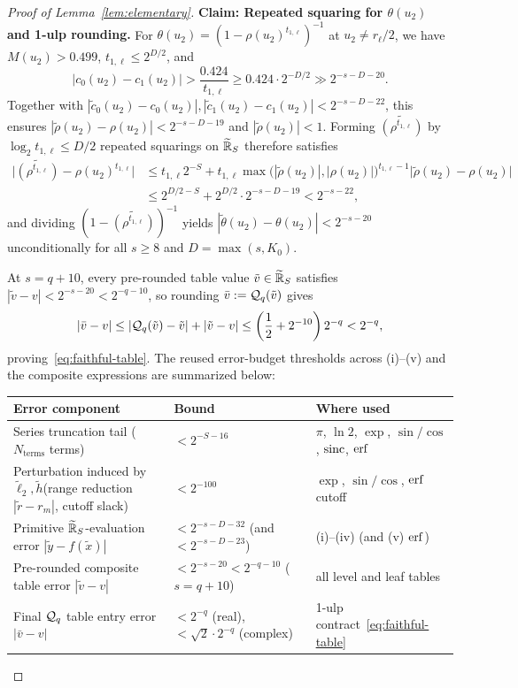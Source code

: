 \begin{proof}[Proof of Lemma~\ref{lem:elementary}]
\textbf{Claim: Repeated squaring for $\theta(u_2)$ and 1-ulp rounding.}
For $\theta(u_2) = (1 - \rho(u_2)^{t_{1,\ell}})^{-1}$ at $u_2 \ne r_\ell/2$, we have $M(u_2) > 0.499$, $t_{1,\ell} \le 2^{D/2}$, and
\[
  |c_0(u_2) - c_1(u_2)| > \frac{0.424}{t_{1,\ell}} \ge 0.424 \cdot 2^{-D/2} \gg 2^{-s-D-20}.
\]
Together with $|\tilde{c}_0(u_2) - c_0(u_2)|, |\tilde{c}_1(u_2) - c_1(u_2)| < 2^{-s-D-22}$, this ensures $|\tilde{\rho}(u_2) - \rho(u_2)| < 2^{-s-D-19}$ and $|\tilde{\rho}(u_2)| < 1$. Forming $\widetilde{(\rho^{t_{1,\ell}})}$ by $\log_2 t_{1,\ell} \le D/2$ repeated squarings on $\widetilde{\mathbb{R}}_S$ therefore satisfies
\begin{align*}
  \bigl|\widetilde{(\rho^{t_{1,\ell}})} - \rho(u_2)^{t_{1,\ell}}\bigr|
  &\le t_{1,\ell} 2^{-S} + t_{1,\ell}\max\bigl(|\tilde{\rho}(u_2)|, |\rho(u_2)|\bigr)^{t_{1,\ell}-1}\bigl|\tilde{\rho}(u_2) - \rho(u_2)\bigr| \\
  &\le 2^{D/2 - S} + 2^{D/2} \cdot 2^{-s-D-19} < 2^{-s-22},
\end{align*}
and dividing $(1 - \widetilde{(\rho^{t_{1,\ell}})})^{-1}$ yields $|\tilde{\theta}(u_2) - \theta(u_2)| < 2^{-s-20}$ unconditionally for all $s \ge 8$ and $D = \max(s, K_0)$.

At $s = q + 10$, every pre-rounded table value $\tilde{v} \in \widetilde{\mathbb{R}}_S$ satisfies $|\tilde{v} - v| < 2^{-s-20} < 2^{-q-10}$, so rounding $\bar{v} := \mathcal{Q}_q(\tilde{v})$ gives
\[
  |\bar{v} - v| \le |\mathcal{Q}_q(\tilde{v}) - \tilde{v}| + |\tilde{v} - v| \le \left(\frac{1}{2} + 2^{-10}\right)2^{-q} < 2^{-q},
\]
proving~\eqref{eq:faithful-table}. The reused error-budget thresholds across (i)--(v) and the composite expressions are summarized below:

\begin{center}
\footnotesize
\renewcommand{\arraystretch}{1.05}
\begin{tabular}{@{}>{\raggedright\arraybackslash}p{}ll@{}}
\toprule
Error component & Bound & Where used \\
\midrule
Series truncation tail ($N_{\mathrm{terms}}$ terms) & $< 2^{-S-16}$ & $\pi$, $\ln 2$, $\exp$, $\sin/\cos$, $\operatorname{sinc}$, $\operatorname{erf}$ \\
Perturbation induced by $\tilde{\ell}_2, \tilde{h}$\newline (range reduction $|\tilde{r} - r_m|$, cutoff slack) & $< 2^{-100}$ & $\exp$, $\sin/\cos$, $\operatorname{erf}$ cutoff \\
Primitive $\widetilde{\mathbb{R}}_S$-evaluation error $|\tilde{y} - f(\tilde{x})|$ & $< 2^{-s-D-32}$ (and $< 2^{-s-D-23}$) & (i)--(iv) (and (v) $\operatorname{erf}$) \\
Pre-rounded composite table error $|\tilde{v} - v|$ & $< 2^{-s-20} < 2^{-q-10}$ ($s = q + 10$) & all level and leaf tables \\
Final $\mathcal{Q}_q$ table entry error $|\bar{v} - v|$ & $< 2^{-q}$ (real), $< \sqrt{2}\cdot 2^{-q}$ (complex) & 1-ulp contract~\eqref{eq:faithful-table} \\
\bottomrule
\end{tabular}
\end{center}


\end{proof}
